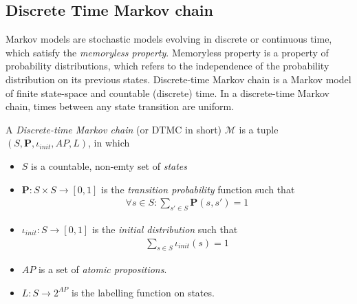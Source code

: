 \subsection{Discrete Time Markov chain}
Markov models are stochastic models evolving in discrete or continuous time, which satisfy the
\textit{memoryless property}. Memoryless property is a property of probability distributions, which
refers to the independence of the probability distribution on its previous states. Discrete-time
Markov chain is a Markov model of finite state-space and countable (discrete) time. In a
discrete-time Markov chain, times between any state transition are uniform.
\begin{definition}
      \rm
      A \textit{Discrete-time Markov chain} (or DTMC in short) $\mathcal{M}$ is a tuple
      $(S,\mathbf{P}, \iota_{init}, AP, L)$, in which
      \begin{itemize}
            \item $S$ is a countable, non-emty set of \textit{states}
            \item $\mathbf{P}:S\times S \rightarrow [0,1]$ is the \textit{transition probability}
                  function such that
                  \begin{align*}
                        \forall s \in S : \sum_{s'\in S}\mathbf{P}(s, s') = 1
                  \end{align*}
            \item $\iota_{init}: S \rightarrow [0,1]$ is the \textit{initial distribution} such that
                  \begin{align*}
                        \sum_{s\in S} \iota_{init}(s) = 1
                  \end{align*}
            \item $AP$ is a set of \textit{atomic propositions}.
            \item $L: S \rightarrow 2^{AP}$ is the labelling function on states.
      \end{itemize}
\end{definition}

